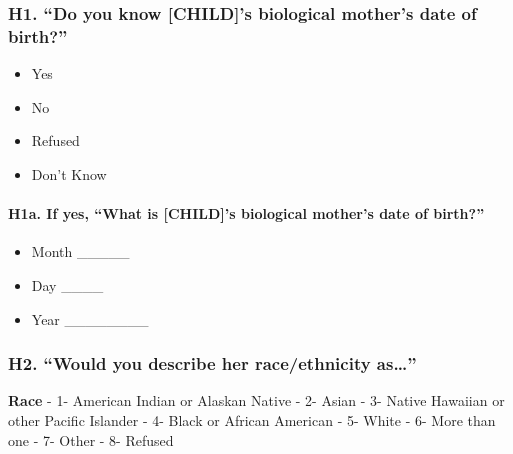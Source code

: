 \documentclass[
  12pt,
]{book}
\providecommand{\tightlist}{%
  \setlength{\itemsep}{0pt}\setlength{\parskip}{0pt}}
\begin{document}
\hypertarget{h1.-do-you-know-childs-biological-mothers-date-of-birth}{%
\subsubsection*{H1. ``Do you know {[}CHILD{]}'s biological mother's date of birth?''}\label{h1.-do-you-know-childs-biological-mothers-date-of-birth}}

\begin{itemize}
\tightlist
\item
  Yes
\item
  No
\item
  Refused
\item
  Don't Know
\end{itemize}

\hypertarget{h1a.-if-yes-what-is-childs-biological-mothers-date-of-birth}{%
\paragraph*{H1a. If yes, ``What is {[}CHILD{]}'s biological mother's date of birth?''}\label{h1a.-if-yes-what-is-childs-biological-mothers-date-of-birth}}

\begin{itemize}
\tightlist
\item
  Month \_\_\_\_\_
\item
  Day \_\_\_\_
\item
  Year \_\_\_\_\_\_\_\_
\end{itemize}

\hypertarget{h2.-would-you-describe-her-raceethnicity-as}{%
\subsubsection*{\texorpdfstring{H2. ``Would you describe her race/ethnicity as\ldots{}''}{H2. ``Would you describe her race/ethnicity as\ldots''}}\label{h2.-would-you-describe-her-raceethnicity-as}}

\textbf{Race}
- 1- American Indian or Alaskan Native
- 2- Asian
- 3- Native Hawaiian or other Pacific Islander
- 4- Black or African American
- 5- White
- 6- More than one
- 7- Other
- 8- Refused
\end{document}
